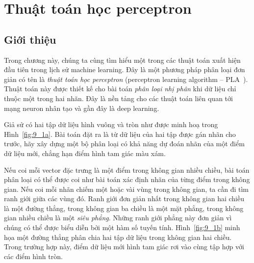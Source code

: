 \chapter{Thuật toán học perceptron}
\label{cha:pla} 
 
 
 
 
 
\section{Giới thiệu}
Trong chương này, chúng ta cùng tìm hiểu một trong các thuật toán xuất hiện đầu
tiên trong lịch sử machine learning. Đây là một phương pháp phân loại đơn giản
có tên là \textit{thuật toán học perceptron} ({perceptron learning
algorithm} -- PLA~\cite{rosemblat1957perceptron}). Thuật toán này được thiết kế
cho bài toán \textit{phân loại nhị phân} khi dữ liệu chỉ thuộc một trong hai
nhãn. Đây là nền tảng cho các thuật toán liên quan tới mạng neuron nhân tạo và
gần đây là deep learning.

 


Giả sử có hai tập dữ liệu hình vuông và tròn như được minh hoạ trong
Hình~\ref{fig:9_1a}. Bài toán đặt ra là từ dữ liệu của hai tập được gán nhãn cho
trước, hãy xây dựng một bộ phân loại có khả năng dự đoán nhãn của một điểm
dữ liệu mới, chẳng hạn điểm hình tam giác màu xám.


Nếu coi mỗi vector đặc trưng là một điểm trong không gian nhiều chiều, bài toán
phân loại có thể được coi như bài toán xác định nhãn của từng điểm trong không
gian. Nếu coi mỗi nhãn {chiếm} một hoặc vài vùng trong không gian, ta cần đi tìm
{ranh giới} giữa các vùng đó. Ranh giới đơn giản nhất trong không gian hai chiều
là một đường thẳng, trong không gian ba chiều là một mặt phẳng, trong không gian
nhiều chiều là một \textit{siêu phẳng}. Những ranh giới phẳng này đơn giản vì
chúng có thể được biểu diễn bởi một hàm số tuyến tính. Hình~\ref{fig:9_1b} minh
họa một đường thẳng phân chia hai tập dữ liệu trong không gian hai chiều. Trong
trường hợp này, điểm dữ liệu mới hình tam giác rơi vào cùng tập hợp với các điểm
hình tròn.

